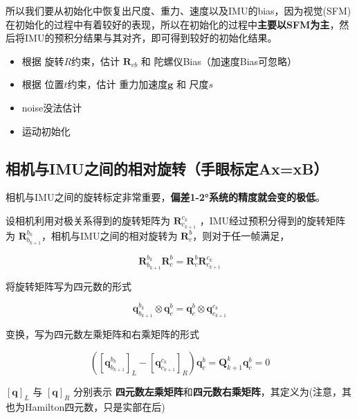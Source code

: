 \documentclass[12pt,a4paper]{article}
\begin{document}
所以我们要从初始化中恢复出尺度、重力、速度以及IMU的bias，因为视觉(SFM)在初始化的过程中有着较好的表现，所以在初始化的过程中\textbf{主要以SFM为主}，然后将IMU的预积分结果与其对齐，即可得到较好的初始化结果。

\begin{itemize}
\item 根据 旋转$R$约束，估计 $\mathbf{R}_{cb}$ 和 陀螺仪Bias（加速度Bias可忽略）
\item 根据 位置$t$约束，估计 重力加速度$\mathbf{g}$ 和 尺度$s$
\item noise没法估计
\item 运动初始化
\end{itemize}

\subsection{相机与IMU之间的相对旋转（手眼标定Ax=xB）}

相机与IMU之间的旋转标定非常重要，\textbf{偏差1-2°系统的精度就会变的极低}\cite{xiaobuyi2018webnote}。

设相机利用对极关系得到的旋转矩阵为 $\mathbf{R}_{c_{k+1}}^{c_k}$ ，IMU经过预积分得到的旋转矩阵为 $\mathbf{R}_{b_{k+1}}^{b_{k}}$，相机与IMU之间的相对旋转为 $\mathbf{R}_{c}^{b}$，则对于任一帧满足，

\begin{equation}
\mathbf{R}^{b_{k}}_{b_{k+1}} \mathbf{R}^{b}_{c}
= \mathbf{R}^{b}_{c} \mathbf{R}^{c_{k}}_{c_{k+1}}
\end{equation}

将旋转矩阵写为四元数的形式

\begin{equation}
\mathbf{q}^{b_{k}}_{b_{k+1}} \otimes \mathbf{q}^{b}_{c}
= \mathbf{q}^{b}_{c} \otimes \mathbf{q}^{c_{k}}_{c_{k+1}}
\end{equation}

变换，写为四元数左乘矩阵和右乘矩阵的形式

\begin{equation}
({[\mathbf{q}^{b_{k}}_{b_{k+1}}]}_L - {[\mathbf{q}^{c_{k}}_{c_{k+1}}]}_R) \mathbf{q}^b_c
= \mathbf{Q}^k_{k+1} \mathbf{q}^b_c = 0
\end{equation}

$[\mathbf{q}]_L$ 与 $[\mathbf{q}]_R$ 分别表示 \textbf{四元数左乘矩阵}和\textbf{四元数右乘矩阵}，其定义为(注意，其也为Hamilton四元数，只是实部在后)
\end{document}
